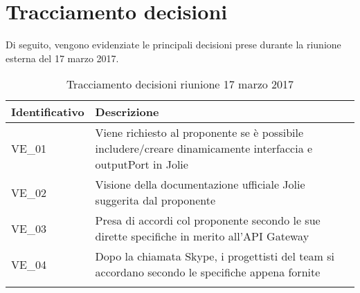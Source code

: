 \section{Tracciamento decisioni}
Di seguito, vengono evidenziate le principali decisioni prese durante la riunione esterna del 17 marzo 2017.

\begin{longtable}{|>{\centering\arraybackslash}p{4cm}|>{\centering\arraybackslash}p{9cm}|}
	\hline \rowcolor{Gray}
	\textbf{Identificativo} & \textbf{Descrizione}\\
	\hline
	\endhead
			VE\_01	& Viene richiesto al proponente se è possibile includere/creare dinamicamente interfaccia e outputPort in Jolie	\\
			\hline
			VE\_02 & Visione della documentazione ufficiale Jolie suggerita dal proponente \\
			\hline
			VE\_03 & Presa di accordi col proponente secondo le sue dirette specifiche in merito all'API Gateway \\
			\hline
			VE\_04 & Dopo la chiamata Skype, i progettisti del team si accordano secondo le specifiche appena fornite \\
			\hline
		\caption{Tracciamento decisioni riunione 17 marzo 2017}
\end{longtable}